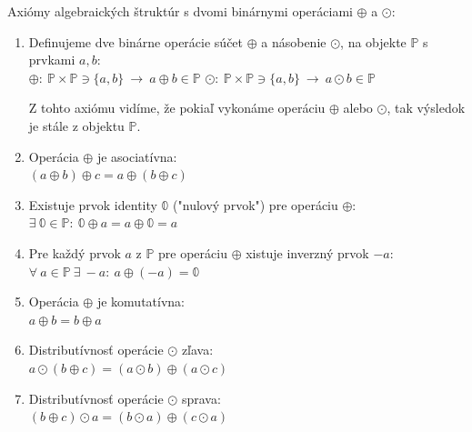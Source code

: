 \documentclass[a4paper, 10pt, ]{article}
\begin{document}
\begin{definition}
    \label{TwoBinaryOperationsStructures.Definition:TwoBinaryOperationsStructures}
    Axiómy algebraických štruktúr s dvomi binárnymi operáciami $\oplus$ a $\odot$:
    \begin{enumerate}\addtocounter{enumi}{-1}
        \TabPositions{1cm}
        \item Definujeme dve binárne operácie súčet $\oplus$ a násobenie $\odot$, na objekte $\mathbb{P}$ s prvkami $a, b$: \\
        \tab\tab $\oplus: \ \mathbb{P}\times\mathbb{P} \owns \{a, b\} \ \rightarrow \ a \oplus b \in \mathbb{P}$ \tab\tab $\odot: \ \mathbb{P}\times\mathbb{P} \owns \{a, b\} \ \rightarrow \ a \odot b \in \mathbb{P}$

        Z tohto axiómu vidíme, že pokiaľ vykonáme operáciu $\oplus$ alebo $\odot$, tak výsledok je stále z objektu $\mathbb{P}$.
        
        \item Operácia $\oplus$ je asociatívna: \\
        \tab\tab $(a \oplus b) \oplus c = a \oplus (b \oplus c)$
        
        \item Existuje prvok identity $\mathbb{0}$ ("nulový prvok") pre operáciu $\oplus$: \\
        \tab\tab $\exists \ \mathbb{0} \in \mathbb{P}: \ \mathbb{0} \oplus a = a \oplus \mathbb{0} = a$
        
        \item Pre každý prvok $a$ z $\mathbb{P}$ pre operáciu $\oplus$ xistuje inverzný prvok $-a$: \\
        \tab\tab $\forall \ a \in \mathbb{P} \ \exists \ -a: \ a \oplus (-a) = \mathbb{0}$
        
        \item Operácia $\oplus$ je komutatívna: \\
        \tab\tab $a \oplus b = b \oplus a$
        
        \item Distributívnosť operácie $\odot$ zľava: \\
        \tab\tab $a \odot (b \oplus c) = (a \odot b) \oplus (a \odot c)$
        
        \item Distributívnosť operácie $\odot$ sprava: \\
        \tab\tab $(b \oplus c) \odot a = (b \odot a) \oplus (c \odot a)$
        

\end{enumerate}
\end{definition}
\end{document}

